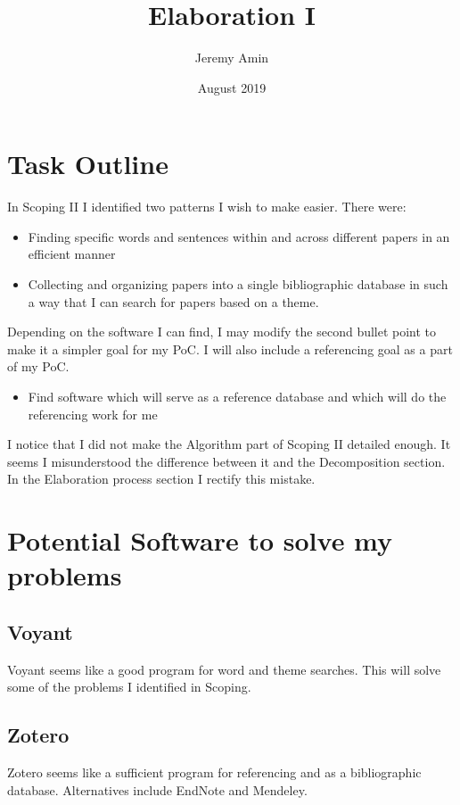 \documentclass{article}
\title{Elaboration I}
\author{Jeremy Amin}
\date{August 2019}
\begin{document}
\maketitle

\tableofcontents

\section{Task Outline}

\noindent
In Scoping II I identified two patterns I wish to make easier. There were:

\begin{itemize}
    \item Finding specific words and sentences within and across different papers in an efficient manner
    \item Collecting and organizing papers into a single bibliographic database in such a way that I can search for papers based on a theme.

\end{itemize}

\noindent
Depending on the software I can find, I may modify the second bullet point to make it a simpler goal for my PoC. I will also include a referencing goal as a part of my PoC.

\begin{itemize}
    \item Find software which will serve as a reference database and which will do the referencing work for me 
\end{itemize}


\noindent
I notice that I did not make the Algorithm part of Scoping II detailed enough. It seems I misunderstood the difference between it and the Decomposition section. In the Elaboration process section I rectify this mistake.


\section{Potential Software to solve my problems}

\subsection{Voyant} 

Voyant seems like a good program for word and theme searches. This will solve some of the problems I identified in Scoping.

\subsection{Zotero}
Zotero seems like a sufficient program for referencing and as a bibliographic database. Alternatives include EndNote and Mendeley.
\end{document}
